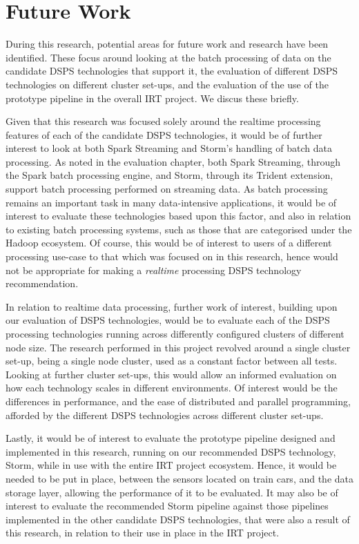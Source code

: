 

\section{Future Work} %
\label{sub:future_work}

During this research, potential areas for future work and research have been identified. These focus around looking at
the batch processing of data on the candidate DSPS technologies that support it, the evaluation of different DSPS technologies on different
cluster set-ups, and the evaluation of the use of the prototype pipeline in the overall IRT project. We discus these briefly.

Given that this research was focused solely around the realtime processing features of each of the candidate DSPS technologies,
it would be of further interest to look at both Spark Streaming and Storm's handling of batch data processing. As noted
in the evaluation chapter, both Spark Streaming, through the Spark batch processing engine, and Storm, through its
Trident extension, support batch processing performed on streaming data. As batch processing remains an important task
in many data-intensive applications, it would be of interest to evaluate these technologies based upon this factor, and also in relation
to existing batch processing systems, such as those that are categorised under the Hadoop ecosystem. Of course, this would
be of interest to users of a different processing use-case to that which was focused on in this research, hence would
not be appropriate for making a \textit{realtime} processing DSPS technology recommendation.

In relation to realtime data processing, further work of interest, building upon our evaluation of DSPS technologies, would
be to evaluate each of the DSPS processing technologies running across differently configured clusters of different node size.
The research performed in this project revolved around a single cluster set-up, being a single node cluster, used as a constant factor between all
tests. Looking at further cluster set-ups, this would allow an informed evaluation on how each technology scales in different environments.
Of interest would be the differences in performance, and the ease of distributed and parallel programming, afforded by the different DSPS technologies across
different cluster set-ups.

Lastly, it would be of interest to evaluate the prototype pipeline designed and implemented in this research, running on our recommended
DSPS technology, Storm, while in use with the entire IRT project ecosystem. Hence, it would be needed to be put in place,
between the sensors located on train cars, and the data storage layer, allowing the performance of it to be evaluated.
It may also be of interest to evaluate the recommended Storm pipeline against those pipelines implemented in the other candidate DSPS technologies,
that were also a result of this research, in relation to their use in place in the IRT project.

